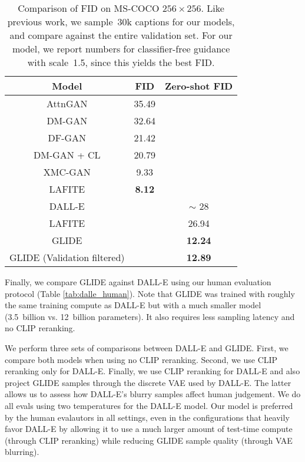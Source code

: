 \documentclass{article}
\newcommand{\modelname}{GLIDE}
\begin{document}
\begin{table}[t]
    \caption{Comparison of FID on MS-COCO $256 \times 256$. Like previous work, we sample~30k captions for our models, and compare against the entire validation set. For our model, we report numbers for classifier-free guidance with scale~1.5, since this yields the best FID.}
    \label{tab:mscoco_fids}
    \vskip 0.15in
    \centering
    \begin{center}
    \begin{small}
    \begin{tabular}{ccc}
    \toprule
    Model & FID & Zero-shot FID \\
    \midrule
    AttnGAN \citep{attngan} & 35.49 & \\
    DM-GAN \citep{dmgan} & 32.64 & \\
    DF-GAN \citep{dfgan} & 21.42 & \\
    DM-GAN + CL \citep{textcl} & 20.79 & \\
    XMC-GAN \citep{xmcgan} & 9.33 & \\
    LAFITE \citep{lafite} & \textbf{8.12} & \\
    \midrule
    DALL-E \citep{dalle} & & $\sim$ 28 \\
    LAFITE \citep{lafite} & & 26.94 \\
    \modelname{} & & \textbf{12.24} \\
    \modelname{} (Validation filtered) & & \textbf{12.89} \\
    \bottomrule
    \end{tabular}
    \end{small}
    \end{center}
    \vskip -0.2in
\end{table}

Finally, we compare \modelname{} against DALL-E using our human evaluation protocol (Table \ref{tab:dalle_human}). Note that \modelname{} was trained with roughly the same training compute as DALL-E but with a much smaller model (3.5~billion vs. 12~billion parameters). It also requires less sampling latency and no CLIP reranking. 

We perform three sets of comparisons between DALL-E and \modelname{}. First, we compare both models when using no CLIP reranking. Second, we use CLIP reranking only for DALL-E. Finally, we use CLIP reranking for DALL-E and also project \modelname{} samples through the discrete VAE used by DALL-E. The latter allows us to assess how DALL-E's blurry samples affect human judgement. We do all evals using two temperatures for the DALL-E model. Our model is preferred by the human evalautors in all settings, even in the configurations that heavily favor DALL-E by allowing it to use a much larger amount of test-time compute (through CLIP reranking) while reducing \modelname{} sample quality (through VAE blurring).
\end{document}
